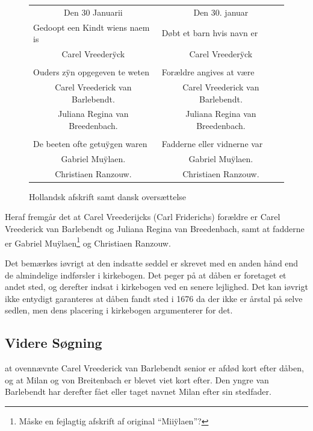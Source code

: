 \documentclass[
	a4paper,
	12pt,
	final
]{memoir}
\begin{document}
\begin{figure}[H]%
	\centerfloat%
	\colorbox{tablebkg}{%
	\begin{tabular}{p{} | p{}}
		\multicolumn{1}{c|}{Den 30 Januarii} & \multicolumn{1}{c}{Den 30. januar} \\
		Gedoopt een Kindt wiens naem is & Døbt et barn hvis navn er \\
		\multicolumn{1}{c|}{\larger Carel Vreederÿck} & \multicolumn{1}{c}{\larger Carel Vreederÿck} \\ %
		& \\
		Ouders zÿn opgegeven te weten & Forældre angives at være \\
		\multicolumn{1}{c|}{Carel Vreederick van Barlebendt.} & \multicolumn{1}{c}{Carel Vreederick van Barlebendt.} \\
		\multicolumn{1}{c|}{Juliana Regina van Breedenbach.} & \multicolumn{1}{c}{Juliana Regina van Breedenbach.} \\
		& \\
		De beeten ofte getuÿgen waren & Fadderne eller vidnerne var \\
		\multicolumn{1}{c|}{Gabriel Muÿlaen.} & \multicolumn{1}{c}{Gabriel Muÿlaen.} \\
		\multicolumn{1}{c|}{Christiaen Ranzouw.} & \multicolumn{1}{c}{Christiaen Ranzouw.} \\
	\end{tabular}}%
	\caption{Hollandsk afskrift samt dansk oversættelse}%
\end{figure}%


Heraf fremgår det at Carel Vreederijcks (Carl Friderichs) forældre er Carel Vreederick van Barlebendt og Juliana Regina van Breedenbach, samt at fadderne er Gabriel Muÿlaen\footnote{Måske en fejlagtig afskrift af original \enquote{Miiÿlaen}?} og Christiaen Ranzouw.

Det bemærkes iøvrigt at den indsatte seddel er skrevet med en anden hånd end de almindelige indførsler i kirkebogen. Det peger på at dåben er foretaget et andet sted, og derefter indsat i kirkebogen ved en senere lejlighed. Det kan iøvrigt ikke entydigt garanteres at dåben fandt sted i 1676 da der ikke er årstal på selve sedlen, men dens placering i kirkebogen argumenterer for det.

\subsection{Videre Søgning}

 at ovennævnte Carel Vreederick van Barlebendt senior er afdød kort efter dåben, og at Milan og von Breitenbach er blevet viet kort efter. Den yngre van Barlebendt har derefter fået eller taget navnet Milan efter sin stedfader.
\end{document}

